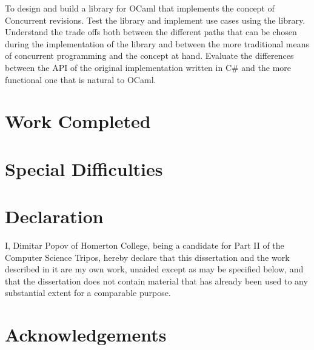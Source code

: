 \documentclass[12pt,twoside,notitlepage]{report}
\begin{document}
To design and build a library for OCaml that implements the concept of Concurrent revisions. Test the library and implement use cases using the library. Understand the trade offs both between the different paths that can be chosen during the implementation of the library and between the more traditional means of concurrent programming and the concept at hand. Evaluate the differences between the API of the original implementation written in C\# and the more functional one that is natural to OCaml. 


\section*{Work Completed}


\section*{Special Difficulties}


 
\newpage
\section*{Declaration}

I, Dimitar Popov of Homerton College, being a candidate for Part II of the Computer
Science Tripos, hereby declare
that this dissertation and the work described in it are my own work,
unaided except as may be specified below, and that the dissertation
does not contain material that has already been used to any substantial
extent for a comparable purpose.

\bigskip
{}

\medskip
{}

\cleardoublepage

\tableofcontents

\listoffigures

\newpage
\section*{Acknowledgements}



\cleardoublepage        %

\setcounter{page}{1}
\pagestyle{headings}
\end{document}
